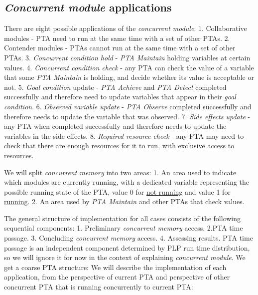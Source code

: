 \subsection{\textit{Concurrent module} applications}
There are eight possible applications of the \textit{concurrent module}: 1. Collaborative modules - PTA need to run at the same time with a set of other PTAs. 2. Contender modules - PTAs cannot run at the same time with a set of other PTAs. 3. \textit{\textit{Concurrent condition} hold} - \textit{PTA Maintain} holding variables at certain values. 4. \textit{\textit{Concurrent condition} check} - any PTA can check the value of a variable that some \textit{PTA Maintain} is holding, and decide whether its value is acceptable or not. 5. \textit{\textit{Goal condition}} update - \textit{PTA Achieve} and \textit{PTA Detect} completed successfully and therefore need to update variables that appear in their \textit{\textit{goal condition}}. 6. \textit{\textit{Observed variable} update} - \textit{PTA Observe} completed successfully and therefore needs to update the variable that was observed. 7. \textit{Side effects update} - any PTA when completed successfully and therefore needs to update the variables in the side effects. 8. \textit{Required resource check} - any PTA may need to check that there are enough resources for it to run, with exclusive access to resources.   
\par We will split \textit{concurrent memory} into two areas: 1. An area used to indicate which modules are currently running, with a dedicated variable representing the possible running state of the PTA, value 0 for \underline{not running} and value 1 for \underline{running}. 2. An area used by \textit{PTA Maintain} and other PTAs that check values.
\par The general structure of implementation for all cases consists of the following sequential components: 1. Preliminary \textit{concurrent memory} access. 2.PTA time passage. 3. Concluding \textit{concurrent memory} access. 4. Assessing results. PTA time passage is an independent component determined by PLP run time distribution, so we will ignore it for now in the context of explaining \textit{concurrent module}. We get a coarse PTA structure:  We will describe the implementation of each application, from the perspective of current PTA and perspective of other concurrent PTA that is running concurrently to current PTA: \\
